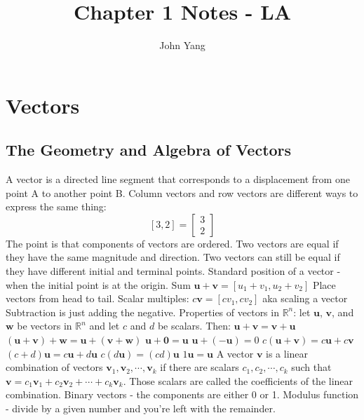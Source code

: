 \documentclass{article}
\title{Chapter 1 Notes - LA} %
\author{John Yang}
\begin{document}
    \maketitle
    \tableofcontents
    \section{Vectors} %
    \subsection{The Geometry and Algebra of Vectors}
    \begin{outline}
        \1 A vector is a directed line segment that corresponds to a displacement from one point A to another point B. 
        \1 Column vectors and row vectors are different ways to express the same thing: \[[3,2]=\begin{bmatrix}3 \\ 2\end{bmatrix}\]
        \1 The point is that components of vectors are ordered. 
        \1 Two vectors are equal if they have the same magnitude and direction. Two vectors can still be equal if they have different initial and terminal points. 
        \1 Standard position of a vector - when the initial point is at the origin. 
        \1 Sum \(\mathbf u+\mathbf v=[u_1+v_1,u_2+v_2]\)
        \1 Place vectors from head to tail. 
        \1 Scalar multiples: \(c\mathbf v=[cv_1,cv_2]\) aka scaling a vector
        \1 Subtraction is just adding the negative. 
        \1 Properties of vectors in \(\mathbb{R}^n\): let \(\mathbf u\), \(\mathbf v\), and \(\mathbf w\) be vectors in \(\mathbb{R}^n\) and let $c$ and $d$ be scalars. Then: 
            \2 \(\mathbf u+\mathbf v=\mathbf v+\mathbf u\)
            \2 \((\mathbf u+\mathbf v)+\mathbf w=\mathbf u+(\mathbf v+\mathbf w)\)
            \2 \(\mathbf u+\mathbf 0=\mathbf u\)
            \2 \(\mathbf u+(-\mathbf u)=0\)
            \2 \(c(\mathbf u+\mathbf v)=c\mathbf u+c\mathbf v\)
            \2 \((c+d)\mathbf u=c\mathbf u+d\mathbf u\)
            \2 \(c(d\mathbf u)=(cd)\mathbf u\)
            \2 \(1\mathbf u=\mathbf u\)
        \1 A vector $\mathbf v$ is a linear combination of vectors \(\mathbf v_1,\mathbf v_2,\cdots,\mathbf v_k\) if there are scalars \(c_1,c_2,\cdots,c_k\) such that \(\mathbf v=c_1\mathbf v_1+c_2\mathbf v_2+\cdots+c_k\mathbf v_k\). Those scalars are called the coefficients of the linear combination. 
        \1 Binary vectors - the components are either 0 or 1. 
        \1 Modulus function - divide by a given number and you're left with the remainder. 

    \end{outline}
\end{document}
